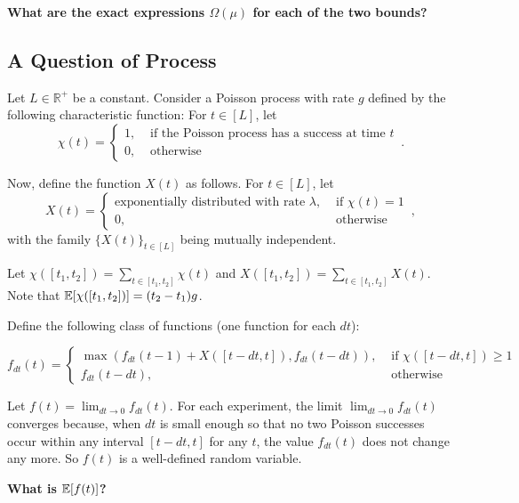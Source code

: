 \textbf{What are the exact expressions $\Omega(\mu)$ for each of the two bounds?}

\subsection{A Question of Process}

Let $L \in \mathbb{R}^+$ be a constant. Consider a Poisson process with rate $g$ defined by the following characteristic function: For $t \in [L]$, let
\[
  \chi(t) = \begin{cases}
    1, & \text{ if the Poisson process has a success at time } t\\
    0, & \text{ otherwise }
  \end{cases}\,.
\]

Now, define the function $X(t)$ as follows. For $t \in [L]$, let
\[
  X(t) = \begin{cases}
    \text{exponentially distributed with rate } \lambda, & \text{ if } \chi(t) = 1\\
    0, & \text{ otherwise }
  \end{cases}\,,
\] with the family $\{ X(t) \}_{t \in [L]}$ being mutually independent.

Let $\chi([t_1, t_2]) = \sum_{t \in [t_1, t_2]} \chi(t)$ and $X([t_1, t_2]) = \sum_{t \in [t_1, t_2]} X(t)$.
Note that $\mathop{{}\mathbb{E}}[\chi([t_1, t_2])] = (t_2 - t_1)g$.

Define the following class of functions (one function for each $dt$):

\[
  f_{dt}(t) = \begin{cases}
    \max(f_{dt}(t - 1) + X([t - dt, t]), f_{dt}(t - dt)), & \text{ if } \chi([t - dt, t]) \geq 1\\
    f_{dt}(t - dt), & \text{ otherwise }
  \end{cases}
\]

Let $f(t) = \lim_{dt \to 0} f_{dt}(t)$. For each experiment, the limit $\lim_{dt \to 0} f_{dt}(t)$ converges because, when $dt$ is small enough so that no two Poisson successes occur within any interval $[t - dt, t]$ for any $t$, the value $f_{dt}(t)$ does not change any more. So $f(t)$ is a well-defined random variable.

\textbf{What is $\mathop{{}\mathbb{E}}[f(t)]$?}